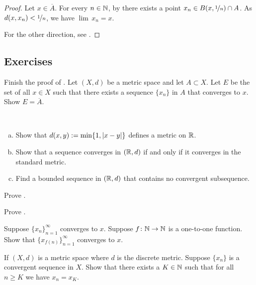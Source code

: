 \begin{proof}
Let $x \in \overline{A}$.  For every $n \in {\mathbb{N}}$,
by
 there
exists a point $x_n \in B(x,\nicefrac{1}{n}) \cap A$.
As $d(x,x_n) < \nicefrac{1}{n}$, we have $\lim\, x_n = x$.

For the other direction, see .
\end{proof}

\subsection{Exercises}

\begin{exercise} \label{exercise:reverseclosedseq}
Finish the proof of 
.
Let $(X,d)$ be a metric space and
let $A \subset X$.  Let $E$ be the set of all $x \in X$ such that there
exists a sequence $\{ x_n \}$ in $A$ that converges to $x$.  Show 
$E = \overline{A}$.
\end{exercise}

\begin{exercise}
{\ }
\begin{enumerate}[a)]
\item
Show that $d(x,y) := \min \{ 1, \left\lvert {x-y} \right\rvert \}$ defines a metric on ${\mathbb{R}}$.
\item
Show that a sequence converges in $({\mathbb{R}},d)$ if and only if it converges
in the standard metric.
\item
Find a bounded sequence in $({\mathbb{R}},d)$ that
contains no convergent subsequence.
\end{enumerate}
\end{exercise}

\begin{exercise}
Prove .
\end{exercise}

\begin{exercise}
Prove .
\end{exercise}

\begin{exercise}
Suppose $\{x_n\}_{n=1}^\infty$ converges to $x$.  Suppose $f \colon {\mathbb{N}}
\to {\mathbb{N}}$ is a one-to-one function.  Show that
$\{ x_{f(n)} \}_{n=1}^\infty$ converges to $x$.
\end{exercise}

\begin{exercise}
If $(X,d)$ is a metric space where $d$ is the discrete metric.  Suppose 
$\{ x_n \}$ is a convergent sequence in $X$.  Show that there exists
a $K \in {\mathbb{N}}$ such that for all $n \geq K$ we have $x_n = x_K$.
\end{exercise}

